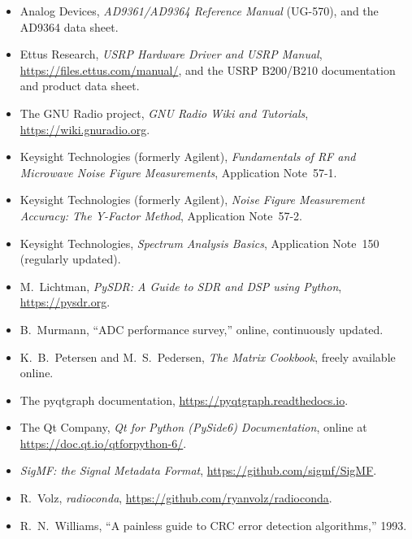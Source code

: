 \begin{itemize}[leftmargin=1.5em,itemindent=-1.5em,itemsep=1.5pt plus 1pt,parsep=0pt,topsep=4pt,label={}]\rightskip=0pt plus 3em\relax
\item Analog Devices, \emph{AD9361/AD9364 Reference Manual} (UG-570), and the AD9364 data sheet.
\item Ettus Research, \emph{USRP Hardware Driver and USRP Manual}, \url{https://files.ettus.com/manual/}, and the USRP B200/B210 documentation and product data sheet.
\item The GNU Radio project, \emph{GNU Radio Wiki and Tutorials}, \url{https://wiki.gnuradio.org}.
\item Keysight Technologies (formerly Agilent), \emph{Fundamentals of RF and Microwave Noise Figure Measurements}, Application Note~57-1.
\item Keysight Technologies (formerly Agilent), \emph{Noise Figure Measurement Accuracy: The Y-Factor Method}, Application Note~57-2.
\item Keysight Technologies, \emph{Spectrum Analysis Basics}, Application Note~150 (regularly updated).
\item M.~Lichtman, \emph{PySDR: A Guide to SDR and DSP using Python}, \url{https://pysdr.org}.
\item B.~Murmann, ``ADC performance survey,'' online, continuously updated.
\item K.~B.~Petersen and M.~S.~Pedersen, \emph{The Matrix Cookbook}, freely available online.
\item The pyqtgraph documentation, \url{https://pyqtgraph.readthedocs.io}.
\item The Qt Company, \emph{Qt for Python (PySide6) Documentation}, online at \url{https://doc.qt.io/qtforpython-6/}.
\item \emph{SigMF: the Signal Metadata Format}, \url{https://github.com/sigmf/SigMF}.
\item R.~Volz, \emph{radioconda}, \url{https://github.com/ryanvolz/radioconda}.
\item R.~N.~Williams, ``A painless guide to CRC error detection algorithms,'' 1993.
\end{itemize}
\endgroup
